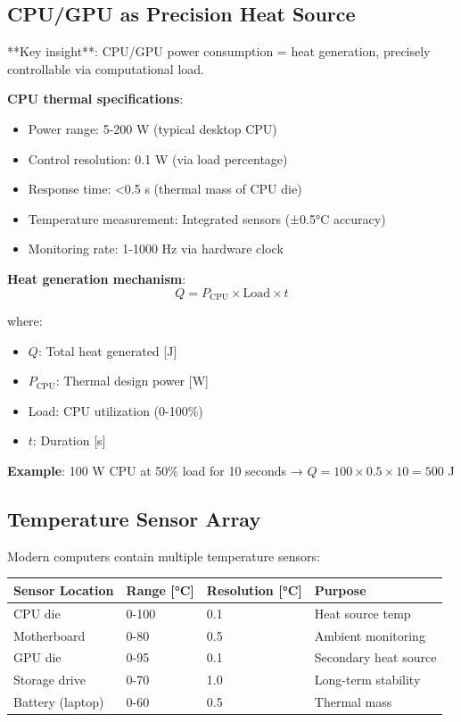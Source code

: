 \documentclass[12pt,a4paper]{article}
\begin{document}
\subsection{CPU/GPU as Precision Heat Source}

**Key insight**: CPU/GPU power consumption = heat generation, precisely controllable via computational load.

\textbf{CPU thermal specifications}:
\begin{itemize}
\item Power range: 5-200 W (typical desktop CPU)
\item Control resolution: 0.1 W (via load percentage)
\item Response time: <0.5 s (thermal mass of CPU die)
\item Temperature measurement: Integrated sensors (±0.5°C accuracy)
\item Monitoring rate: 1-1000 Hz via hardware clock
\end{itemize}

\textbf{Heat generation mechanism}:
\begin{equation}
Q = P_{\text{CPU}} \times \text{Load} \times t
\end{equation}

where:
\begin{itemize}
\item $Q$: Total heat generated [J]
\item $P_{\text{CPU}}$: Thermal design power [W]
\item Load: CPU utilization (0-100\%)
\item $t$: Duration [s]
\end{itemize}

\textbf{Example}: 100 W CPU at 50\% load for 10 seconds → $Q = 100 \times 0.5 \times 10 = 500$ J

\subsection{Temperature Sensor Array}

Modern computers contain multiple temperature sensors:

\begin{center}
\begin{tabular}{|l|l|l|l|}
\hline
\textbf{Sensor Location} & \textbf{Range [°C]} & \textbf{Resolution [°C]} & \textbf{Purpose} \\
\hline
CPU die & 0-100 & 0.1 & Heat source temp \\
Motherboard & 0-80 & 0.5 & Ambient monitoring \\
GPU die & 0-95 & 0.1 & Secondary heat source \\
Storage drive & 0-70 & 1.0 & Long-term stability \\
Battery (laptop) & 0-60 & 0.5 & Thermal mass \\
\hline
\end{tabular}
\end{center}
\end{document}
